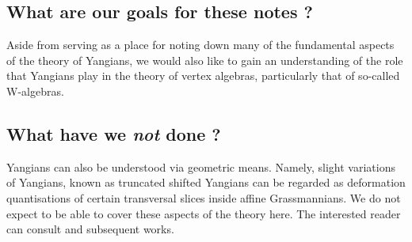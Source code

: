     \subsection{What are our goals for these notes ?}
        Aside from serving as a place for noting down many of the fundamental aspects of the theory of Yangians, we would also like to gain an understanding of the role that Yangians play in the theory of vertex algebras, particularly that of so-called W-algebras. 

    \subsection{What have we \textit{not} done ?}
        Yangians can also be understood via geometric means. Namely, slight variations of Yangians, known as truncated shifted Yangians can be regarded as deformation quantisations of certain transversal slices inside affine Grassmannians. We do not expect to be able to cover these aspects of the theory here. The interested reader can consult \cite{quantisation_of_affine_grassmannian_slices} and subsequent works.